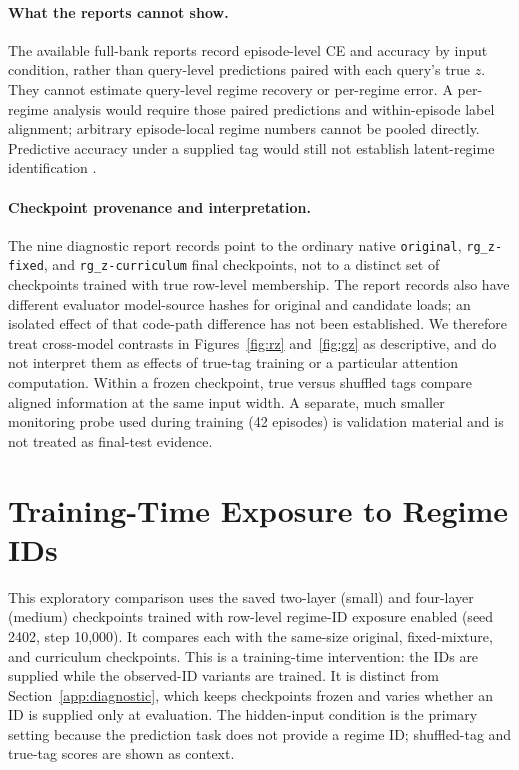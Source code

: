 \documentclass{article}
\begin{document}
\paragraph{What the reports cannot show.} The available full-bank reports record episode-level CE and accuracy by input condition, rather than query-level predictions paired with each query's true $z$. They cannot estimate query-level regime recovery or per-regime error. A per-regime analysis would require those paired predictions and within-episode label alignment; arbitrary episode-local regime numbers cannot be pooled directly. Predictive accuracy under a supplied tag would still not establish latent-regime identification \citep{jiang1999identifiability}.

\paragraph{Checkpoint provenance and interpretation.} The nine diagnostic report records point to the ordinary native \texttt{original}, \texttt{rg\_z-fixed}, and \texttt{rg\_z-curriculum} final checkpoints, not to a distinct set of checkpoints trained with true row-level membership. The report records also have different evaluator model-source hashes for original and candidate loads; an isolated effect of that code-path difference has not been established. We therefore treat cross-model contrasts in Figures~\ref{fig:rz} and~\ref{fig:gz} as descriptive, and do not interpret them as effects of true-tag training or a particular attention computation. Within a frozen checkpoint, true versus shuffled tags compare aligned information at the same input width. A separate, much smaller monitoring probe used during training (42 episodes) is validation material and is not treated as final-test evidence.

\FloatBarrier
\section{Training-Time Exposure to Regime IDs}\label{app:observed-id}
This exploratory comparison uses the saved two-layer (small) and four-layer (medium) checkpoints trained with row-level regime-ID exposure enabled (seed 2402, step 10,000). It compares each with the same-size original, fixed-mixture, and curriculum checkpoints. This is a training-time intervention: the IDs are supplied while the observed-ID variants are trained. It is distinct from Section~\ref{app:diagnostic}, which keeps checkpoints frozen and varies whether an ID is supplied only at evaluation. The hidden-input condition is the primary setting because the prediction task does not provide a regime ID; shuffled-tag and true-tag scores are shown as context.
\end{document}
